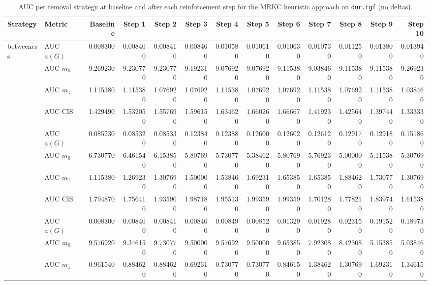 \begin{table}[htbp]
  \centering
  \caption{AUC per removal strategy at baseline and after each reinforcement step for the MRKC heuristic approach on \texttt{dur.tgf} (no deltas).}
  \label{tab:dur-mrkc_heuristic-auc}
\setlength{\tabcolsep}{2.5pt}
  \begin{tabular}{llrrrrrrrrrrr}
    \toprule
    \textbf{Strategy} & \textbf{Metric} & \textbf{Baseline} & \textbf{Step 1} & \textbf{Step 2} & \textbf{Step 3} & \textbf{Step 4} & \textbf{Step 5} & \textbf{Step 6} & \textbf{Step 7} & \textbf{Step 8} & \textbf{Step 9} & \textbf{Step 10} \\
    \midrule
    \multirow{4}{*}{betweeness} & AUC $a(G)$ & 0.008300 & 0.008400 & 0.008410 & 0.008460 & 0.010580 & 0.010610 & 0.010630 & 0.010730 & 0.011250 & 0.013800 & 0.013940 \\
    & AUC $m_0$ & 9.269230 & 9.230770 & 9.230770 & 9.192310 & 9.076920 & 9.076920 & 9.115380 & 9.038460 & 9.115380 & 9.115380 & 9.269230 \\
    & AUC $m_1$ & 1.115380 & 1.115380 & 1.076920 & 1.076920 & 1.115380 & 1.076920 & 1.076920 & 1.115380 & 1.076920 & 1.115380 & 1.038460 \\
    & AUC CIS & 1.429490 & 1.532050 & 1.557690 & 1.596150 & 1.634620 & 1.660260 & 1.666670 & 1.419230 & 1.425640 & 1.397440 & 1.333330 \\
    \addlinespace
    \multirow{4}{*}{closeness} & AUC $a(G)$ & 0.085230 & 0.085320 & 0.085330 & 0.123840 & 0.123880 & 0.126000 & 0.126020 & 0.126120 & 0.129170 & 0.129180 & 0.151860 \\
    & AUC $m_0$ & 6.730770 & 6.461540 & 6.153850 & 5.807690 & 5.730770 & 5.384620 & 5.807690 & 5.769230 & 5.000000 & 5.115380 & 5.307690 \\
    & AUC $m_1$ & 1.115380 & 1.269230 & 1.307690 & 1.500000 & 1.538460 & 1.692310 & 1.653850 & 1.653850 & 1.884620 & 1.730770 & 1.307690 \\
    & AUC CIS & 1.794870 & 1.756410 & 1.935900 & 1.987180 & 1.955130 & 1.993590 & 1.993590 & 1.701280 & 1.778210 & 1.839740 & 1.615380 \\
    \addlinespace
    \multirow{4}{*}{core influence} & AUC $a(G)$ & 0.008300 & 0.008400 & 0.008410 & 0.008460 & 0.008490 & 0.008520 & 0.013290 & 0.019280 & 0.023150 & 0.191520 & 0.189730 \\
    & AUC $m_0$ & 9.576920 & 9.346150 & 9.730770 & 9.500000 & 9.576920 & 9.500000 & 9.653850 & 7.923080 & 8.423080 & 5.153850 & 5.038460 \\
    & AUC $m_1$ & 0.961540 & 0.884620 & 0.884620 & 0.692310 & 0.730770 & 0.730770 & 0.846150 & 1.384620 & 1.307690 & 1.692310 & 1.346150 \\

\end{tabular}
\end{table}
